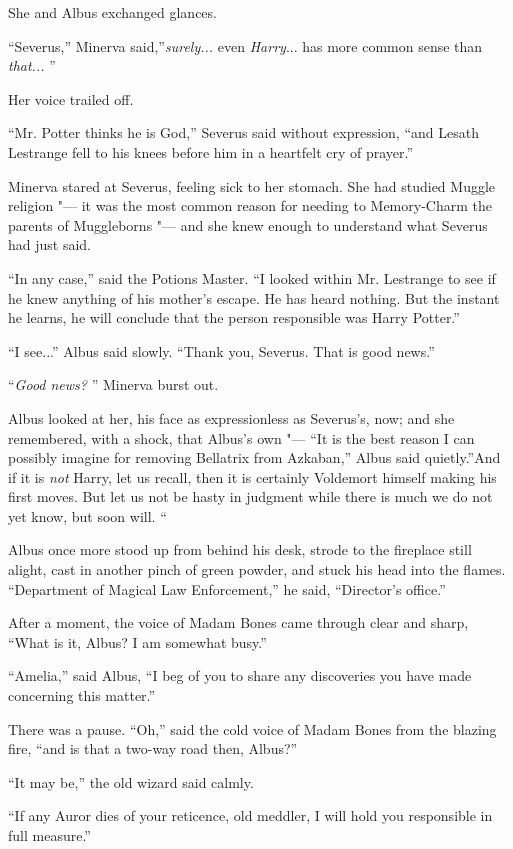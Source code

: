 She and Albus exchanged glances.

``Severus,'' Minerva said,''\emph{surely...} even
\emph{Harry}... has more common sense than \emph{that...} ''

Her voice trailed off.

``Mr. Potter thinks he is God,'' Severus said without expression, ``and
Lesath Lestrange fell to his knees before him in a heartfelt cry of
prayer.''

Minerva stared at Severus, feeling sick to her stomach. She had studied
Muggle religion "--- it was the most common reason for needing to
Memory-Charm the parents of Muggleborns "--- and she knew enough to
understand what Severus had just said.

``In any case,'' said the Potions Master. ``I looked within Mr.
Lestrange to see if he knew anything of his mother's escape. He has
heard nothing. But the instant he learns, he will conclude that the
person responsible was Harry Potter.''

``I see...'' Albus said slowly. ``Thank you, Severus. That is good
news.''

``\emph{Good news?} '' Minerva burst out.

Albus looked at her, his face as expressionless as Severus's, now; and
she remembered, with a shock, that Albus's own "--- ``It is the best reason
I can possibly imagine for removing Bellatrix from Azkaban,'' Albus said
quietly.''And if it is \emph{not} Harry, let us recall, then it is
certainly Voldemort himself making his first moves. But let us not be
hasty in judgment while there is much we do not yet know, but soon will.
``

Albus once more stood up from behind his desk, strode to the fireplace
still alight, cast in another pinch of green powder, and stuck his head
into the flames. ``Department of Magical Law Enforcement,'' he said,
``Director's office.''

After a moment, the voice of Madam Bones came through clear and sharp,
``What is it, Albus? I am somewhat busy.''

``Amelia,'' said Albus, ``I beg of you to share any discoveries you have
made concerning this matter.''

There was a pause. ``Oh,'' said the cold voice of Madam Bones from the
blazing fire, ``and is that a two-way road then, Albus?''

``It may be,'' the old wizard said calmly.

``If any Auror dies of your reticence, old meddler, I will hold you
responsible in full measure.''


